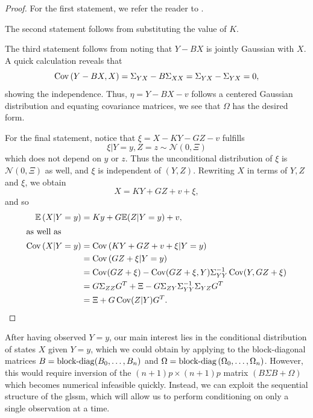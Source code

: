 \begin{proof}
    For the first statement, we refer the reader to \citep[Chapter 4, Lemma 1]{Durbin2012Time}.
    
    The second statement follows from substituting the value of $K$. 

    The third statement follows from noting that $Y-BX$ is jointly Gaussian with $X$. A quick calculation reveals that $$\operatorname{Cov} \left( Y- BX, X \right) = \Sigma_{YX} - B \Sigma_{XX} = \Sigma_{YX} - \Sigma_{YX} = 0,$$
    showing the independence. Thus, $\eta = Y - BX - v$ follows a centered Gaussian distribution and equating covariance matrices, we see that $\Omega$ has the desired form.

    For the final statement, notice that $\xi = X - KY - GZ - v$ fulfills 
    $$
    \xi | Y = y, Z = z \sim \mathcal N(0, \Xi)
    $$
    which does not depend on $y$ or $z$. Thus the unconditional distribution of $\xi$ is $\mathcal N(0, \Xi)$ as well, and $\xi$ is independent of $(Y, Z)$. Rewriting $X$ in terms of $Y,Z$ and $\xi$, we obtain 
    $$
    X = KY + GZ + v + \xi,
    $$
    and so
    \begin{align*}
        \mathbb E \left( X | Y = y \right) &= Ky + G \mathbb E (Z| Y = y) + v,\\
        \intertext{as well as}
        \operatorname{Cov} \left( X | Y = y \right) &= \operatorname{Cov} \left(KY + GZ+v +\xi|  Y = y\right) \\
            &= \operatorname{Cov} \left( GZ + \xi | Y = y  \right) \\
            &= \operatorname{Cov} (GZ + \xi) - \operatorname{Cov}(GZ + \xi, Y) \Sigma_{YY}^{-1} \operatorname{Cov} (Y, GZ + \xi)\\
            &= G \Sigma_{ZZ}G^{T} + \Xi - G \Sigma_{ZY}\Sigma_{YY}^{-1}\Sigma_{YZ}G^{T}\\
            &= \Xi + G \operatorname{Cov}(Z|Y) G^{T}.
    \end{align*}
\end{proof}

After having observed $Y = y$, our main interest lies in the conditional distribution of states $X$ given $Y= y$, which we could obtain by applying  to the block-diagonal matrices $B = \operatorname{block-diag} (B_{0}, \dots, B_{n})$ and $\Omega = \operatorname{block-diag} \left( \Omega_{0}, \dots, \Omega_{n} \right)$. However, this would require inversion of the $(n+1)p\times(n+1)p$ matrix $\left( B\Sigma B + \Omega \right)$ which becomes numerical infeasible quickly. Instead, we can exploit the sequential structure of the \gls{glssm}, which will allow us to perform conditioning on only a single observation at a time. 

